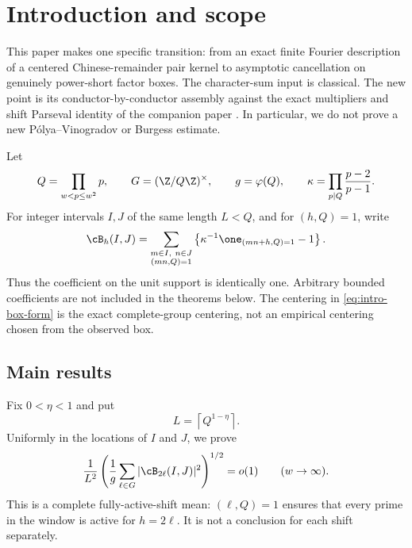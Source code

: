 \section{Introduction and scope}\label{sec:introduction}

This paper makes one specific transition: from an exact finite Fourier
description of a centered Chinese-remainder pair kernel to asymptotic
cancellation on genuinely power-short factor boxes.  The character-sum input
is classical.  The new point is its conductor-by-conductor assembly against
the exact multipliers and shift Parseval identity of the companion paper
\citep{WangCenteredKernels2026}.  In particular, we do not prove a new
P\'olya--Vinogradov or Burgess estimate.

Let
\begin{equation}\label{eq:intro-Q-G-kappa}
 Q=\prod_{w<p\le w^2}p,
 \qquad
 G=(\Z/Q\Z)^\times,
 \qquad
 g=\varphi(Q),
 \qquad
 \kappa=\prod_{p\mid Q}\frac{p-2}{p-1}.
\end{equation}
For integer intervals $I,J$ of the same length $L<Q$, and for $(h,Q)=1$,
write
\begin{equation}\label{eq:intro-box-form}
 \cB_h(I,J)
 =\sum_{\substack{m\in I,\ n\in J\\(mn,Q)=1}}
 \left\{
  \kappa^{-1}\one_{(mn+h,Q)=1}-1
 \right\}.
\end{equation}
Thus the coefficient on the unit support is identically one.  Arbitrary
bounded coefficients are not included in the theorems below.  The centering
in \eqref{eq:intro-box-form} is the exact complete-group centering, not an
empirical centering chosen from the observed box.

\subsection{Main results}

Fix $0<\eta<1$ and put
\begin{equation}\label{eq:intro-power-short-length}
 L=\left\lceil Q^{1-\eta}\right\rceil.
\end{equation}
Uniformly in the locations of $I$ and $J$, we prove
\begin{equation}\label{eq:intro-complete-shift-result}
 \frac1{L^2}
 \left(
  \frac1g\sum_{\ell\in G}|\cB_{2\ell}(I,J)|^2
 \right)^{1/2}
 =o(1)
 \qquad (w\to\infty).
\end{equation}
This is a complete fully-active-shift mean: $(\ell,Q)=1$ ensures that every
prime in the window is active for $h=2\ell$.  It is not a conclusion for
each shift separately.

